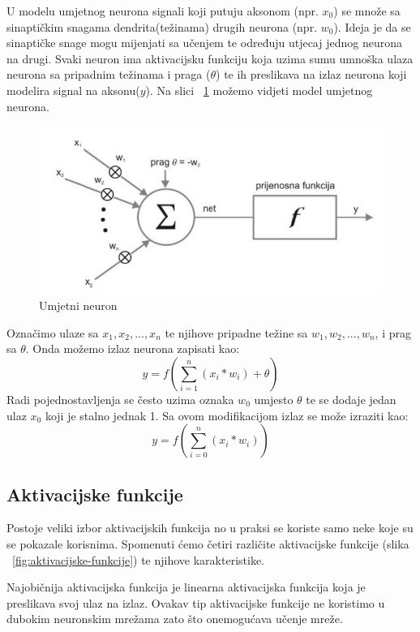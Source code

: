 \documentclass[times, utf8, zavrsni]{fer}
\begin{document}
U modelu umjetnog neurona signali koji putuju aksonom (npr. \textbf{$x_{0}$}) se množe sa sinaptičkim snagama dendrita(težinama) drugih neurona (npr. \textbf{$w_{0}$}). Ideja je da se sinaptičke snage mogu mijenjati sa učenjem te određuju utjecaj jednog neurona na drugi. Svaki neuron ima aktivacijsku funkciju koja uzima sumu umnoška ulaza neurona sa pripadnim težinama i praga ($\theta$) te ih preslikava na izlaz neurona koji modelira signal na aksonu($y$). Na slici ~\ref{fig:umj-neuron} možemo vidjeti model umjetnog neurona. 
\begin{figure}
    \centering
    \includegraphics[width=12cm]{img/umj-neuron.png}
    \caption{Umjetni neuron}
    \label{fig:umj-neuron}
\end{figure}

Označimo ulaze sa $x_{1},x_{2},...,x_{n}$ te njihove pripadne težine sa $w_{1},w_{2},...,w_{n}$, i prag sa $\theta$. Onda možemo izlaz neurona zapisati kao:
\begin{equation}
y = f(\displaystyle\sum_{i=1}^{n}(x_i*w_i) + \theta)
\end{equation}
Radi pojednostavljenja se često uzima oznaka $w_0$ umjesto $\theta$ te se dodaje jedan ulaz $x_0$ koji je stalno jednak 1. Sa ovom modifikacijom izlaz se može izraziti kao:
\begin{equation}
y = f(\displaystyle\sum_{i=0}^{n}(x_i*w_i))
\end{equation}
\subsection{Aktivacijske funkcije}
Postoje veliki izbor aktivacijskih funkcija no u praksi se koriste samo neke koje su se pokazale korisnima. Spomenuti ćemo četiri različite aktivacijske funkcije (slika ~\ref{fig:aktivacijske-funkcije}) te njihove karakteristike.

Najobičnija aktivacijska funkcija je linearna aktivacijska funkcija koja je preslikava svoj ulaz na izlaz. Ovakav tip aktivacijske funkcije ne koristimo u dubokim neuronskim mrežama zato što onemogućava učenje mreže. 
\end{document}
